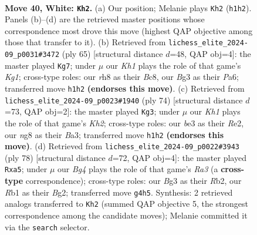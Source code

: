 \documentclass[11pt]{article}
\begin{document}
\clearpage

\begin{figure}[p]\centering
\begin{subfigure}{0.46\textwidth}\centering
\resizebox{\linewidth}{!}{%
\newchessgame
\chessboard[
  setfen={3r2nr/p6p/5k2/8/P5B1/1Pp1b1BP/R1P3P1/1R5K w - - 1 40},
  showmover=false,
  pgfstyle=straightmove, color=movearrow, markmove={h1-h2}
]}
\caption{}
\end{subfigure}\hfill
\begin{subfigure}{0.46\textwidth}\centering
\resizebox{\linewidth}{!}{%
\newchessgame
\chessboard[
  setfen={2b1r1k1/5p2/p1p3p1/2Pp4/3Pp2B/8/4N3/3K3R b - - 1 33},
  showmover=false,
  pgfstyle=straightmove, color=movearrow, markmove={g8-g7}
]}
\caption{}
\end{subfigure}
\\[4pt]
\begin{subfigure}{0.46\textwidth}\centering
\resizebox{\linewidth}{!}{%
\newchessgame
\chessboard[
  setfen={8/1p3k1p/2b3p1/3n4/3r3P/BP3P2/1P2R1PK/8 w - - 8 38},
  showmover=false,
  pgfstyle=straightmove, color=movearrow, markmove={h2-g3}
]}
\caption{}
\end{subfigure}\hfill
\begin{subfigure}{0.46\textwidth}\centering
\resizebox{\linewidth}{!}{%
\newchessgame
\chessboard[
  setfen={3r1k2/2r2ppp/3p4/p1n5/2P5/R5P1/1R3PBP/6K1 w - - 0 40},
  showmover=false,
  pgfstyle=straightmove, color=movearrow, markmove={a3-a5}
]}
\caption{}
\end{subfigure}
\caption{\textbf{Move 40, White: \texttt{Kh2}.} (a) Our position; Melanie plays \texttt{Kh2} (\texttt{h1h2}). Panels (b)--(d) are the retrieved master positions whose correspondence most drove this move (highest QAP objective among those that transfer to it). (b) Retrieved from \texttt{lichess\_elite\_2024-09\_p0031\#3472} (ply 65) [structural distance $d$=48, QAP obj=4]: the master played \texttt{Kg7}; under $\mu$ our \emph{Kh1} plays the role of that game's \emph{Kg1}; cross-type roles: our \emph{r}h8 as their \emph{B}c8, our \emph{B}g3 as their \emph{P}a6; transferred move \texttt{h1h2} \textbf{(endorses this move)}. (c) Retrieved from \texttt{lichess\_elite\_2024-09\_p0023\#1940} (ply 74) [structural distance $d$=73, QAP obj=2]: the master played \texttt{Kg3}; under $\mu$ our \emph{Kh1} plays the role of that game's \emph{Kh2}; cross-type roles: our \emph{b}e3 as their \emph{R}e2, our \emph{n}g8 as their \emph{B}a3; transferred move \texttt{h1h2} \textbf{(endorses this move)}. (d) Retrieved from \texttt{lichess\_elite\_2024-09\_p0022\#3943} (ply 78) [structural distance $d$=72, QAP obj=4]: the master played \texttt{Rxa5}; under $\mu$ our \emph{Bg4} plays the role of that game's \emph{Ra3} (a \textbf{cross-type} correspondence); cross-type roles: our \emph{B}g3 as their \emph{R}b2, our \emph{R}b1 as their \emph{B}g2; transferred move \texttt{g4h5}. Synthesis: 2 retrieved analogs transferred to \texttt{Kh2} (summed QAP objective 5, the strongest correspondence among the candidate moves); Melanie committed it via the \texttt{search} selector.}
\label{fig:thought-m78}
\end{figure}
\end{document}
